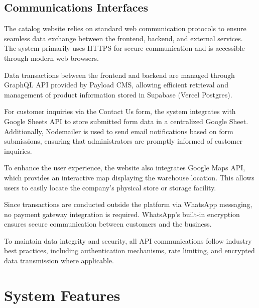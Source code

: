 \documentclass[oneside,a4paper,12pt,explicit]{book}
\begin{document}
\section{Communications Interfaces}
The catalog website relies on standard web communication protocols to ensure seamless data exchange between the frontend, backend, and external services. The system primarily uses HTTPS for secure communication and is accessible through modern web browsers.

Data transactions between the frontend and backend are managed through GraphQL API provided by Payload CMS, allowing efficient retrieval and management of product information stored in Supabase (Vercel Postgres).

For customer inquiries via the Contact Us form, the system integrates with Google Sheets API to store submitted form data in a centralized Google Sheet. Additionally, Nodemailer is used to send email notifications based on form submissions, ensuring that administrators are promptly informed of customer inquiries.

To enhance the user experience, the website also integrates Google Maps API, which provides an interactive map displaying the warehouse location. This allows users to easily locate the company's physical store or storage facility.

Since transactions are conducted outside the platform via WhatsApp messaging, no payment gateway integration is required. WhatsApp's built-in encryption ensures secure communication between customers and the business.

To maintain data integrity and security, all API communications follow industry best practices, including authentication mechanisms, rate limiting, and encrypted data transmission where applicable.

\chapter{System Features}

\end{document}
